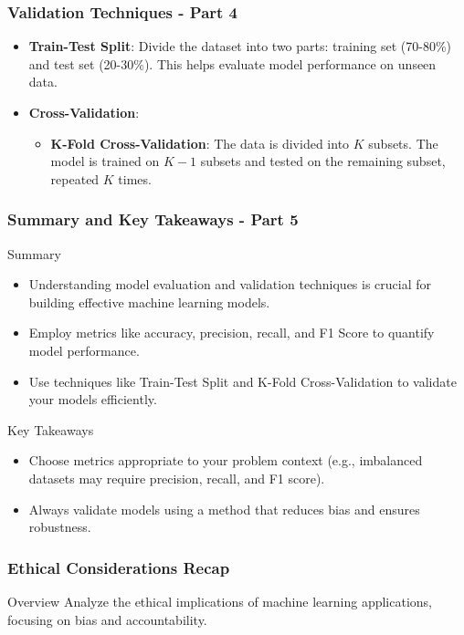 \documentclass[aspectratio=169]{beamer}
\begin{document}
\begin{frame}[fragile]
    \frametitle{Validation Techniques - Part 4}
    \begin{itemize}
        \item \textbf{Train-Test Split}: Divide the dataset into two parts: training set (70-80\%) and test set (20-30\%). This helps evaluate model performance on unseen data.

        \item \textbf{Cross-Validation}:
        \begin{itemize}
            \item \textbf{K-Fold Cross-Validation}: The data is divided into \( K \) subsets. The model is trained on \( K-1 \) subsets and tested on the remaining subset, repeated \( K \) times.
        \end{itemize}
    \end{itemize}
\end{frame}

\begin{frame}[fragile]
    \frametitle{Summary and Key Takeaways - Part 5}
    \begin{block}{Summary}
        \begin{itemize}
            \item Understanding model evaluation and validation techniques is crucial for building effective machine learning models.
            \item Employ metrics like accuracy, precision, recall, and F1 Score to quantify model performance.
            \item Use techniques like Train-Test Split and K-Fold Cross-Validation to validate your models efficiently.
        \end{itemize}
    \end{block}
    
    \begin{block}{Key Takeaways}
        \begin{itemize}
            \item Choose metrics appropriate to your problem context (e.g., imbalanced datasets may require precision, recall, and F1 score).
            \item Always validate models using a method that reduces bias and ensures robustness.
        \end{itemize}
    \end{block}
\end{frame}

\begin{frame}[fragile]
    \frametitle{Ethical Considerations Recap}
    \begin{block}{Overview}
        Analyze the ethical implications of machine learning applications, focusing on bias and accountability.
    \end{block}
\end{frame}
\end{document}

